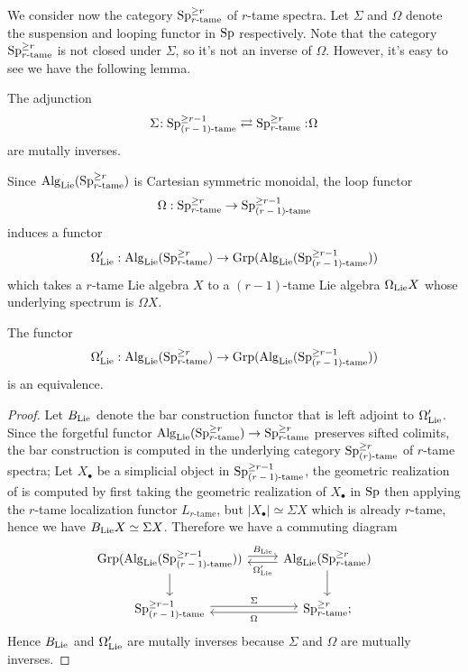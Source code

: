 We consider now the category $\operatorname{Sp}^{\geq r}_{\text{$r$-tame}}$ of $r$-tame spectra.
Let $\Sigma$ and $\Omega$ denote the suspension and looping functor in $\operatorname{Sp}$ respectively.
Note that the category $\operatorname{Sp}^{\geq r}_{\text{$r$-tame}}$ is not closed under $\Sigma$, so it's not an inverse of $\Omega$.
However, it's easy to see we have the following lemma.
\begin{lemma}
\label{Relations between different tameness}
	The adjunction
	\[
	\Sigma\negmedspace: \operatorname{Sp}^{\geq r-1}_{\text{$(r-1)$-tame}}\rightleftarrows \operatorname{Sp}^{\geq r}_{\text{$r$-tame}}:\negmedspace \Omega
	\]
	are mutally inverses.
\end{lemma} 

Since $\operatorname{Alg}_{\operatorname{Lie}}(\operatorname{Sp}^{\geq r}_{\text{$r$-tame}})$ is Cartesian symmetric monoidal, the loop functor 
$$
\Omega: \operatorname{Sp}^{\geq r}_{\text{$r$-tame}}
\to 
\operatorname{Sp}^{\geq r-1}_{\text{$(r-1)$-tame}}
$$
induces a functor
\[
\Omega_{\operatorname{Lie}}':\operatorname{Alg}_{\operatorname{Lie}}(\operatorname{Sp}^{\geq r}_{\text{$r$-tame}}) \to \operatorname{Grp}( \operatorname{Alg}_{\operatorname{Lie}}(\operatorname{Sp}^{\geq r-1}_{\text{$(r-1)$-tame}}) )
\]
which takes a $r$-tame Lie algebra $X$ to a $(r-1)$-tame Lie algebra $\Omega_{\operatorname{Lie}}X$ whose underlying spectrum is $\Omega X$.
\begin{proposition}
	\label{B and Omega are mutally inverses}
	The functor 
	\[
	\Omega_{\operatorname{Lie}}': 
	\operatorname{Alg}_{\operatorname{Lie}}(\operatorname{Sp}^{\geq r}_{\text{$r$-tame}}) \to \operatorname{Grp}( \operatorname{Alg}_{\operatorname{Lie}}(\operatorname{Sp}^{\geq r-1}_{\text{$(r-1)$-tame}}) )
	\]
	is an equivalence.
\end{proposition}
\begin{proof}
	Let $B_{\operatorname{Lie}}$ denote the bar construction functor that is left adjoint to $\Omega_{\operatorname{Lie}}'$. Since the forgetful functor 	
	$\operatorname{Alg}_{\operatorname{Lie}}(\operatorname{Sp}^{\geq r}_{\text{$r$-tame}}) \to \operatorname{Sp}^{\geq r}_{\text{$r$-tame}}$ preserves sifted colimits, the bar construction is computed in the underlying category $\operatorname{Sp}^{\geq r}_{\text{$(r)$-tame}}$ of $r$-tame spectra;
	Let $X_{\bullet}$ be a simplicial object in $\operatorname{Sp}^{\geq r-1}_{\text{$(r-1)$-tame}}$, the geometric realization of is computed by first taking the geometric realization of $X_{\bullet}$ in $\operatorname{Sp}$ then applying the $r$-tame localization functor $L_{\text{$r$-tame}}$, but $|X_{\bullet}|\simeq \Sigma X$ which is already $r$-tame, hence we have $B_{\operatorname{Lie}}X\simeq \Sigma X$.
	Therefore we have a commuting diagram
	\[
	\begin{tikzcd}
		\Grp( \Alg_{\Lie}(\Sp^{\geq r-1}_{\text{$(r-1)$-tame}}) ) & \Alg_{\Lie}(\Sp^{\geq r}_{\text{$r$-tame}})\\
		\Sp^{\geq r-1}_{\text{$(r-1)$-tame}} &
		\Sp^{\geq r}_{\text{$r$-tame}};
		\arrow[from=1-1, to=1-2, "B_{\Lie}", shift left]
		\arrow[from=1-2, to=1-1, "\Omega_{\Lie}'", shift left]
		\arrow[from=1-1, to=2-1]
		\arrow[from=1-2, to=2-2]
		\arrow[from=2-1, to=2-2, "\Sigma", shift left]
		\arrow[from=2-2, to=2-1, "\Omega", shift left]
	\end{tikzcd}
	\]
	Hence $B_{\operatorname{Lie}}$ and $\Omega_{\operatorname{Lie}}'$ are mutally inverses because $\Sigma$ and $\Omega$ are mutually inverses.
\end{proof}

